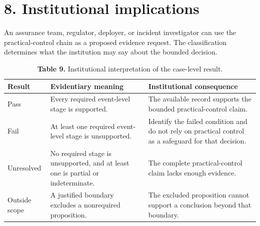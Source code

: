 \documentclass[11pt]{article}
\begin{document}
\section*{8. Institutional implications}
An assurance team, regulator, deployer, or incident investigator can use the practical-control chain as a proposed evidence request. The classification determines what the institution may say about the bounded decision.
\begin{table}[!htbp]
\centering
\caption*{\textcolor{TAENavy}{\textbf{Table 9.}} Institutional interpretation of the case-level result.}
\footnotesize
{}
\begin{tabularx}{\linewidth}{@{}>{\raggedright\arraybackslash}p{}>{\raggedright\arraybackslash}p{}>{\raggedright\arraybackslash}X@{}}
\toprule
\rowcolor{TAEPaleNavy}
\textcolor{TAENavy}{\textbf{Result}} & \textcolor{TAENavy}{\textbf{Evidentiary meaning}} & \textcolor{TAENavy}{\textbf{Institutional consequence}} \\
\midrule
Pass & Every required event-level stage is supported. & The available record supports the bounded practical-control claim. \\
Fail & At least one required event-level stage is unsupported. & Identify the failed condition and do not rely on practical control as a safeguard for that decision. \\
Unresolved & No required stage is unsupported, and at least one is partial or indeterminate. & The complete practical-control claim lacks enough evidence. \\
Outside scope & A justified boundary excludes a nonrequired proposition. & The excluded proposition cannot support a conclusion beyond that boundary. \\
\bottomrule
\end{tabularx}
\end{table}
\end{document}

